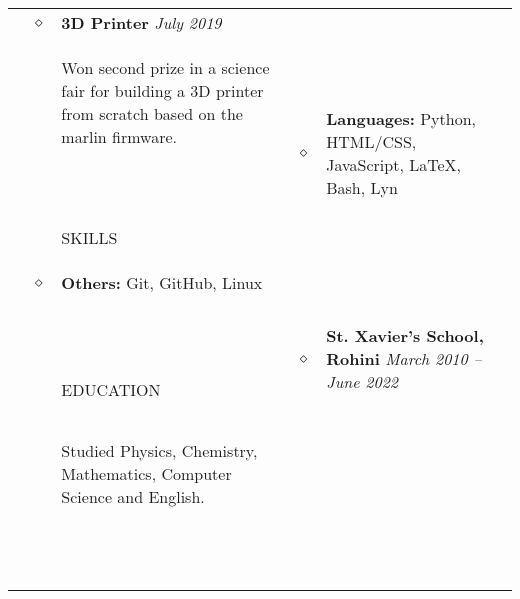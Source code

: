 \documentclass[11pt]{article}
\begin{document}
\begin{tabularx}{\textwidth}{@{}b{90px} b{9px}@{} X@{}}
        \\ & $\diamond$ &

        \textbf{3D Printer} \hfill \textit{July 2019} \\ & &
        Won second prize in a science fair for building a 3D printer from scratch based on the marlin firmware.

        \iftoggle{lines}{\\ \\ \hline \\}{\\ \\}


        \lettrine[lines=1,loversize=-0.5]{S}KILLS & $\diamond$ &

        \textbf{Languages:} Python, HTML/CSS, JavaScript, \LaTeX, Bash, Lyn & &

        \\ & $\diamond$ &

        \textbf{Others:} Git, GitHub, Linux \\ & &

        \iftoggle{lines}{\\ \\ \hline \\}{\\ \\}


        \lettrine[lines=1,loversize=-0.5]{E}DUCATION & $\diamond$ &

        \textbf{St. Xavier's School, Rohini} \hfill \textit{March 2010 -- June 2022} \\ & &
        Studied Physics, Chemistry, Mathematics, Computer Science and English.

        \iftoggle{lines}{\\ \\ \hline \\}{\\ \\}



\end{tabularx}
\end{document}
